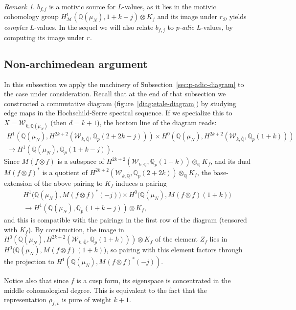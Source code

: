 \documentclass[11pt, a4paper, reqno]{amsart}
\theoremstyle{definition}
\theoremstyle{plain}
\theoremstyle{remark}
\newtheorem*{remark}{Remark}
\DeclareMathOperator{\et}{\acute{e}t}
\DeclareMathOperator{\mot}{\mathscr{M}}
\newcommand{\numberset}{\mathbb}
\newcommand{\Q}{\numberset{Q}}
\newcommand{\KS}{\mathscr{W}}
\newcommand{\del}{\mathcal{D}}
\newcommand{\regulator}[1]{r_{#1}}
\newcommand{\rD}{\regulator{\del}}
\newcommand{\ret}{\regulator{\et}}
\begin{document}
\begin{remark}
    $b_{f, j}$ is a motivic source for $L$-values, as it lies in the motivic cohomology group $H^1_{\mot}(\Q(\mu_N),1+k-j)\otimes K_f$ and its image under $\rD$ yields \emph{complex} $L$-values. In the sequel we will also relate $b_{f, j}$ to \emph{$p$-adic} $L$-values, by computing its image under $\ret$.
\end{remark}

 \subsection{Non-archimedean argument}
  \label{subsec:p-adic-argument}

  In this subsection we apply the machinery of Subsection~\ref{sec:p-adic-diagram} to the case under consideration. Recall that at the end of that subsection we constructed a commutative diagram (figure~\ref{diag:etale-diagram}) by studying edge maps in the Hochschild-Serre spectral sequence. If we specialize this to $X = \KS_{k,\Q(\mu_N)}$ (then $d = k+1$), the bottom line of the diagram reads:
  \begin{multline*}
   H^1\left(\Q(\mu_N), H^{2k+2}_{\et}(\KS_{k,\overline{\Q}},\Q_p(2+2k-j))\right) \times H^0\left(\Q(\mu_N),H^{2k+2}_{\et}(\KS_{k,\overline{\Q}},\Q_p(1+k))\right) \\
   \to H^1\left(\Q(\mu_N),\Q_p(1+k-j)\right).
  \end{multline*}
  Since $M_{\et}(f\otimes f)$ is a subspace of $H^{2k+2}_{\et}(\KS_{k,\overline{\Q}},\Q_p(1+k)) \otimes_{\Q} K_f$, and its dual $M_{\et}(f\otimes f)^*$ is a quotient of $H^{2k+2}_{\et}(\KS_{k,\overline{\Q}},\Q_p(2+2k)) \otimes_{\Q} K_f$, the base-extension of the above pairing to $K_f$ induces a pairing
  \begin{multline*}
   H^1\Big(\Q(\mu_N),M_{\et}(f\otimes f)^*(-j)\Big) \times H^0\Big(\Q(\mu_N),M_{\et}(f\otimes f)(1+k)\Big) \\
   \to H^1(\Q(\mu_N),\Q_p(1+k-j)) \otimes K_f,
  \end{multline*}
  and this is compatible with the pairings in the first row of the diagram (tensored with $K_f$). By construction, the image in $H^0\left(\Q(\mu_N),H^{2k+2}_{\et}(\KS_{k,\overline{\Q}},\Q_p(1+k))\right) \otimes K_f$ of the element $Z_f$ lies in $H^0\Big(\Q(\mu_N),M_{\et}(f\otimes f)(1+k)\Big)$, so pairing with this element factors through the projection to $H^1\left(\Q(\mu_N),M_{\et}(f\otimes f)^*(-j)\right)$.

  Notice also that since $f$ is a cusp form, its eigenspace is concentrated in the middle cohomological degree. This is equivalent to the fact that the representation $\rho_{f,v}$ is pure of weight $k+1$.
  
\end{document}
